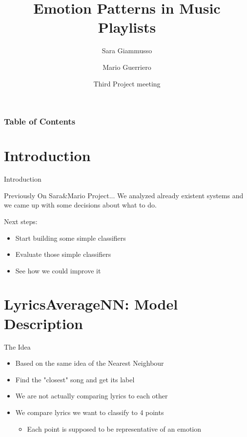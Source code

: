\documentclass[xcolor=dvipsnames]{beamer}
\title[Emotion Patterns in Music Playlists] %
{Emotion Patterns in Music Playlists}
\author[Sara, Mario] %
{Sara Giammusso\inst{1}\inst{2} \and Mario Guerriero \inst{1}\inst{2}}
\institute[EURECOM] %
{
 \inst{1}
 MSc student in Data Science Department, EURECOM, T\'el\'ecom ParisTech, France\\
  \inst{2}%
 MSc student in Department of Control and Computer Engineering, Politecnico di Torino, Italy
}
\date[2018 April 5] %
{Third Project meeting}
\begin{document}
\frame{\titlepage}

\begin{frame}
\frametitle{Table of Contents}
\tableofcontents
\end{frame}

\section{Introduction}
\begin{frame}{Introduction}
\begin{block}{Previously On Sara\&Mario Project...}
We analyzed already existent systems and we came up with some decisions about what to do.\\
\end{block}
Next steps:
\begin{itemize}
\item Start building some simple classifiers
\item Evaluate those simple classifiers
\item See how we could improve it
\end{itemize}
\end{frame}

\section{LyricsAverageNN: Model Description}

\begin{frame}{The Idea}
\begin{itemize}
\item Based on the same idea of the Nearest Neighbour
\item Find the "closest" song and get its label
\item We are not actually comparing lyrics to each other
\item We compare lyrics we want to classify to 4 points
\begin{itemize}
\item Each point is supposed to be representative of an emotion
\end{itemize}
\end{itemize}
\end{frame}
\end{document}
